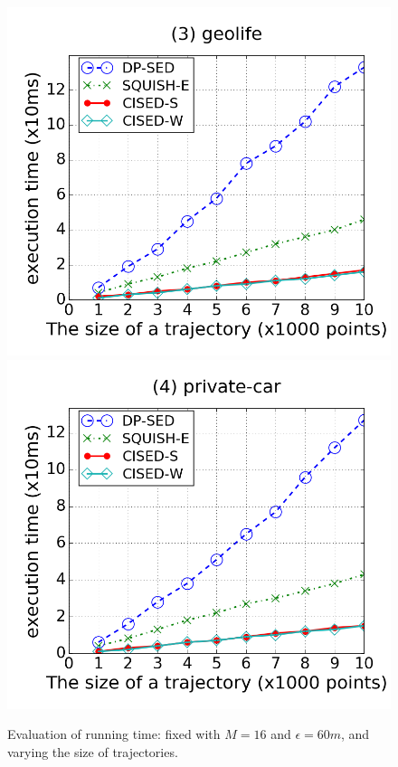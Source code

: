 \begin{figure}[tb!]
\includegraphics[scale = 0.250]{figures/Exp-time-size-geolife.png}
\includegraphics[scale = 0.250]{figures/Exp-time-size-private.png}
\vspace{-2ex}
\caption{\small Evaluation of running time: fixed with $M=16$ and $\epsilon=60m$, and varying the size of trajectories.}
\label{fig:time-size}
\vspace{-2ex}
\end{figure}





